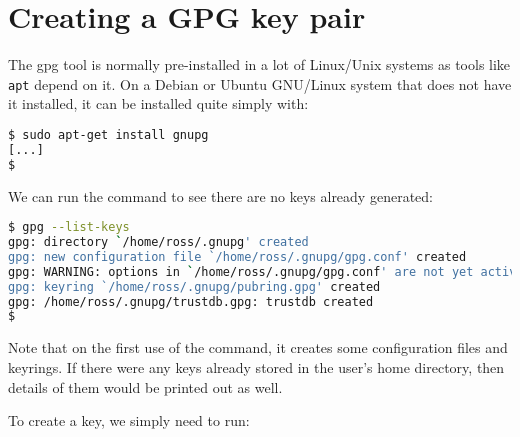 \documentclass{report}
\begin{document}
\section{Creating a GPG key pair}

The gpg tool is normally pre-installed in a lot of Linux/Unix systems as
tools like \texttt{apt} depend on it. On
a Debian or Ubuntu GNU/Linux system that does not have it installed, it
can be installed quite simply with:

\begin{lstlisting}[language=bash]
$ sudo apt-get install gnupg
[...]
$
\end{lstlisting}

We can run the command to see there are no keys already generated:

\begin{lstlisting}[language=bash]
$ gpg --list-keys
gpg: directory `/home/ross/.gnupg' created
gpg: new configuration file `/home/ross/.gnupg/gpg.conf' created
gpg: WARNING: options in `/home/ross/.gnupg/gpg.conf' are not yet active during this run
gpg: keyring `/home/ross/.gnupg/pubring.gpg' created
gpg: /home/ross/.gnupg/trustdb.gpg: trustdb created
$
\end{lstlisting}

Note that on the first use of the command, it creates some configuration files
and keyrings. If there were any keys already stored in the user's home
directory, then details of them would be printed out as well.

To create a key, we simply need to run:
\end{document}
